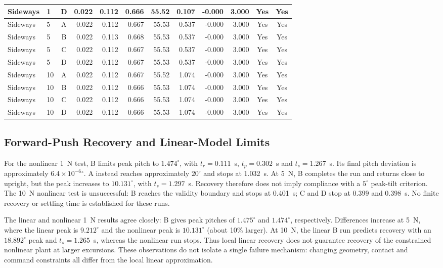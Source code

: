 \documentclass[conference,a4paper]{IEEEtran}
\begin{document}
\begin{table}[!t]
\begin{tabular}{@{}llcrrrrrrrcc@{}}
Sideways & 1 & D & 0.022 & 0.112 & 0.666 & 55.52 & 0.107 & -0.000 & 3.000 & Yes & Yes\\
\midrule
Sideways & 5 & A & 0.022 & 0.112 & 0.667 & 55.53 & 0.537 & -0.000 & 3.000 & Yes & Yes\\
Sideways & 5 & B & 0.022 & 0.113 & 0.668 & 55.53 & 0.537 & -0.000 & 3.000 & Yes & Yes\\
Sideways & 5 & C & 0.022 & 0.112 & 0.667 & 55.53 & 0.537 & -0.000 & 3.000 & Yes & Yes\\
Sideways & 5 & D & 0.022 & 0.112 & 0.667 & 55.53 & 0.537 & -0.000 & 3.000 & Yes & Yes\\
\midrule
Sideways & 10 & A & 0.022 & 0.112 & 0.667 & 55.52 & 1.074 & -0.000 & 3.000 & Yes & Yes\\
Sideways & 10 & B & 0.022 & 0.112 & 0.666 & 55.53 & 1.074 & -0.000 & 3.000 & Yes & Yes\\
Sideways & 10 & C & 0.022 & 0.112 & 0.666 & 55.53 & 1.074 & -0.000 & 3.000 & Yes & Yes\\
Sideways & 10 & D & 0.022 & 0.112 & 0.666 & 55.53 & 1.074 & -0.000 & 3.000 & Yes & Yes\\
\bottomrule\end{tabular}\end{table}

\subsection{Forward-Push Recovery and Linear-Model Limits}
For the nonlinear 1~N test, B limits peak pitch to $1.474^\circ$, with $t_r=0.111$~s, $t_p=0.302$~s and $t_s=1.267$~s. Its final pitch deviation is approximately $6.4\times10^{-6}\!{}^\circ$. A instead reaches approximately $20^\circ$ and stops at 1.032~s. At 5~N, B completes the run and returns close to upright, but the peak increases to $10.131^\circ$, with $t_s=1.297$~s. Recovery therefore does not imply compliance with a $5^\circ$ peak-tilt criterion. The 10~N nonlinear test is unsuccessful: B reaches the validity boundary and stops at 0.401~s; C and D stop at 0.399 and 0.398~s. No finite recovery or settling time is established for these runs.

The linear and nonlinear 1~N results agree closely: B gives peak pitches of $1.475^\circ$ and $1.474^\circ$, respectively. Differences increase at 5~N, where the linear peak is $9.212^\circ$ and the nonlinear peak is $10.131^\circ$ (about 10\% larger). At 10~N, the linear B run predicts recovery with an $18.892^\circ$ peak and $t_s=1.265$~s, whereas the nonlinear run stops. Thus local linear recovery does not guarantee recovery of the constrained nonlinear plant at larger excursions. These observations do not isolate a single failure mechanism: changing geometry, contact and command constraints all differ from the local linear approximation.
\end{document}
